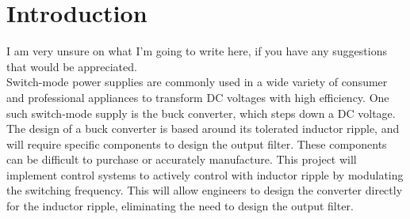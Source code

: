 \chapter{Introduction}\label{C:intro}

I am very unsure on what I'm going to write here, if you have any suggestions that would be appreciated.\\

Switch-mode power supplies are commonly used in a wide variety of consumer and professional appliances to transform DC voltages with high efficiency. One such switch-mode supply is the buck converter, which steps down a DC voltage. The design of a buck converter is based around its tolerated inductor ripple, and will require specific components to design the output filter. These components can be difficult to purchase or accurately manufacture. This project will implement control systems to actively control with inductor ripple by modulating the switching frequency. This will allow engineers to design the converter directly for the inductor ripple, eliminating the need to design the output filter.